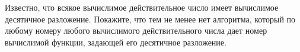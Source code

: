 Известно, что всякое вычислимое действительное число имеет вычислимое десятичное разложение. Покажите, что тем не менее нет
алгоритма, который по любому номеру любого вычислимого действительного числа дает номер вычислимой функции, задающей его
десятичное разложение.